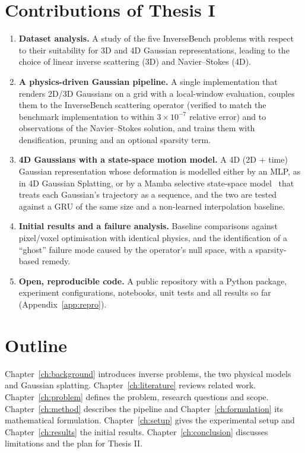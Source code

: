 \section{Contributions of Thesis I}
\begin{enumerate}
  \item \textbf{Dataset analysis.} A study of the five InverseBench problems with respect to their suitability for
  3D and 4D Gaussian representations, leading to the choice of linear inverse scattering (3D) and Navier--Stokes (4D).
  \item \textbf{A physics-driven Gaussian pipeline.} A single implementation that renders 2D/3D Gaussians on a grid
  with a local-window evaluation, couples them to the InverseBench scattering operator (verified to match the
  benchmark implementation to within $3\times10^{-7}$ relative error) and to observations of the Navier--Stokes
  solution, and trains them with densification, pruning and an optional sparsity term.
  \item \textbf{4D Gaussians with a state-space motion model.} A 4D (2D + time) Gaussian representation whose
  deformation is modelled either by an MLP, as in 4D Gaussian Splatting, or by a Mamba selective state-space
  model~\citep{gu2023mamba} that treats each Gaussian's trajectory as a sequence, and the two are tested against a
  GRU of the same size and a non-learned interpolation baseline.
  \item \textbf{Initial results and a failure analysis.} Baseline comparisons against pixel/voxel optimisation with
  identical physics, and the identification of a ``ghost'' failure mode caused by the operator's null space, with a
  sparsity-based remedy.
  \item \textbf{Open, reproducible code.} A public repository with a Python package, experiment configurations,
  notebooks, unit tests and all results so far (Appendix~\ref{app:repro}).
\end{enumerate}

\section{Outline}
Chapter~\ref{ch:background} introduces inverse problems, the two physical models and Gaussian splatting.
Chapter~\ref{ch:literature} reviews related work. Chapter~\ref{ch:problem} defines the problem, research questions
and scope. Chapter~\ref{ch:method} describes the pipeline and Chapter~\ref{ch:formulation} its mathematical
formulation. Chapter~\ref{ch:setup} gives the experimental setup and Chapter~\ref{ch:results} the initial results.
Chapter~\ref{ch:conclusion} discusses limitations and the plan for Thesis II.

